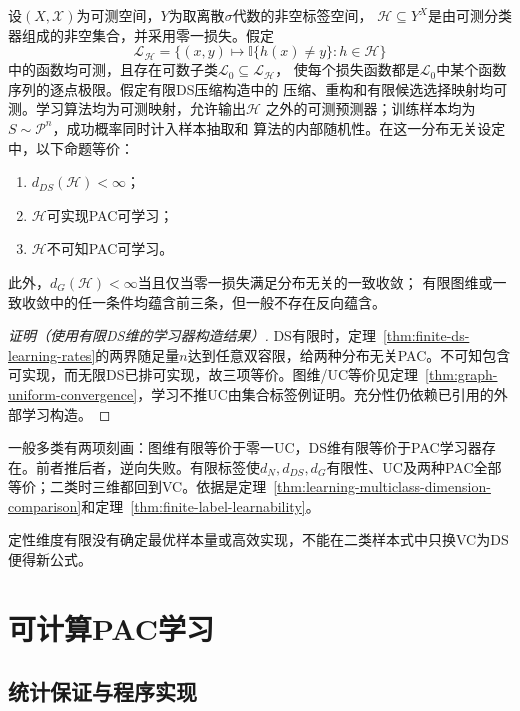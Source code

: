 \begin{theorem}[多分类学习基本定理]
\label{thm:ds-characterization}
设$(X,\mathcal X)$为可测空间，$Y$为取离散$\sigma$代数的非空标签空间，
$\mathcal H\subseteq Y^X$是由可测分类器组成的非空集合，并采用零一损失。假定
\[
 \mathcal L_{\mathcal H}
 =\{(x,y)\mapsto\mathbb I\{h(x)\neq y\}:h\in\mathcal H\}
\]
中的函数均可测，且存在可数子类$\mathcal L_0\subseteq\mathcal L_{\mathcal H}$，
使每个损失函数都是$\mathcal L_0$中某个函数序列的逐点极限。假定有限DS压缩构造中的
压缩、重构和有限候选选择映射均可测。学习算法均为可测映射，允许输出$\mathcal H$
之外的可测预测器；训练样本均为$S\sim\mathcal P^n$，成功概率同时计入样本抽取和
算法的内部随机性。在这一分布无关设定中，以下命题等价：
\begin{enumerate}
 \item $d_{DS}(\mathcal H)<\infty$；
 \item $\mathcal H$可实现PAC可学习；
 \item $\mathcal H$不可知PAC可学习。
\end{enumerate}
此外，$d_G(\mathcal H)<\infty$当且仅当零一损失满足分布无关的一致收敛；
有限图维或一致收敛中的任一条件均蕴含前三条，但一般不存在反向蕴含。
\end{theorem}

\begin{proof}[证明（使用有限DS维的学习器构造结果）]
DS有限时，定理~\ref{thm:finite-ds-learning-rates}的两界随足量$n$达到任意双容限，给两种分布无关PAC。不可知包含可实现，而无限DS已排可实现，故三项等价。图维/UC等价见定理~\ref{thm:graph-uniform-convergence}，学习不推UC由集合标签例证明。充分性仍依赖已引用的外部学习构造。
\end{proof}

一般多类有两项刻画：图维有限等价于零一UC，DS维有限等价于PAC学习器存在。前者推后者，逆向失败。有限标签使$d_N,d_{DS},d_G$有限性、UC及两种PAC全部等价；二类时三维都回到VC。依据是定理~\ref{thm:learning-multiclass-dimension-comparison}和定理~\ref{thm:finite-label-learnability}。

定性维度有限没有确定最优样本量或高效实现，不能在二类样本式中只换VC为DS便得新公式。

\section{可计算PAC学习}
\label{sec:computable-multiclass-learning}

\subsection{统计保证与程序实现}


